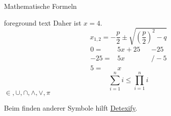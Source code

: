 \documentclass[aspectratio=169]{beamer}
\newcommand\citestyle[1]{\textcolor{foreground-secondary}{\textsuperscript{#1}}}
\let\oldautocite\autocite
\renewcommand{\autocite}[1]{\citestyle{\oldautocite{#1}}}
\begin{document}
\begin{frame}[fragile]{Mathematische Formeln}
\begin{minipage}{0.33\textwidth}
\begin{OutputBox}
\begin{beamercolorbox}{foreground text}
    Daher ist \(x=4\). %
    \[
        x_{1,2} = -\frac{p}{2}\pm
        \sqrt{\left(\frac{p}{2}\right)^2-q}
    \] %
    \begin{align*}
      0   =& 5x + 25 && -25 \\
      -25 =& 5x      && /-5 \\
      5   =& x
    \end{align*}
    $$ \sum\limits_{i=1}^n i 
       \leq \prod\limits_{i=1}^n i $$
    $ \in, \cup, \cap, \land, \lor, \pi $

            \end{beamercolorbox}
        \end{OutputBox}
    \egroup

    \end{minipage}

    Beim finden anderer Symbole hilft
    \href{https://detexify.kirelabs.org/classify.html}{\alert{\underline{Detexify}}}.\autocite{detexify}
    \end{frame}
\end{document}

